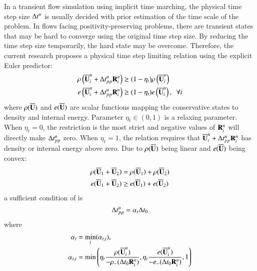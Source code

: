 \documentclass[preprint,12pt]{elsarticle}
\begin{document}
In a transient flow simulation using implicit
time marching, the
physical time step size $\mathrm\Delta t^n$
is usually decided with prior estimation
of the time scale of the problem.
In flows facing positivity-preserving problems,
there are transient states that may be hard
to converge using the original time step size.
By reducing the time step size temporarily,
the hard state may be overcome.
Therefore, the current research
proposes a physical time step limiting relation using
the explicit Euler predictor:
\begin{equation}
    \label{eq:ppLimitDt}
    \begin{aligned}
        \rho\left(\overline{\mathbf{U}}_i^n + \mathrm\Delta t^{n}_{pp}\mathbf{R}_i^n\right)
         & \geq
        (1- \eta_t)
        \rho\left(\overline{\mathbf{U}}_i^n\right) \\
        e\left(\overline{\mathbf{U}}_i^n + \mathrm\Delta t^{n}_{pp}\mathbf{R}_i^n\right)
         & \geq
        (1- \eta_t)
        e\left(\overline{\mathbf{U}}_i^n\right), \ \ \forall i
    \end{aligned}
\end{equation}
where $\rho(\overline{\mathbf{U}})$ and $e(\overline{\mathbf{U}})$ are scalar functions
mapping the conservative states to density and internal energy.
Parameter $\eta_t\in(0,1)$ is a relaxing parameter.
When $\eta_t=0$, the restriction is the most strict and
negative values of $\mathbf{R}_i^n$ will directly make $\mathrm\Delta t^n_{pp}$
zero.
When  $\eta_t=1$, the relation requires that $\overline{\mathbf{U}}_i^n + \mathrm\Delta t^{n}_{pp}\mathbf{R}_i^n$
has density or internal energy above zero.
Due to $\rho(\overline{\mathbf{U}})$ being linear and $e(\overline{\mathbf{U}})$ being convex:
\begin{equation}
    \begin{aligned}
        \rho(\overline{\mathbf{U}}_1 + \overline{\mathbf{U}}_2) & = \rho(\overline{\mathbf{U}}_1) + \rho(\overline{\mathbf{U}}_2) \\
        e(\overline{\mathbf{U}}_1 + \overline{\mathbf{U}}_2)    & \geq e(\overline{\mathbf{U}}_1) + e(\overline{\mathbf{U}}_2)    \\
    \end{aligned}
\end{equation}
a sufficient condition of  is
\begin{equation}
    \mathrm\Delta t^n_{pp} = \alpha_t \mathrm\Delta t_0 
\end{equation}
where
\begin{equation}
    \begin{aligned}
        \alpha_t     & = \min_i(\alpha_{t,i}), \\
        \alpha_{t,i} & = \min\left(
        \eta_t\frac{\rho(\overline{\mathbf{U}}_i^n)}{-\rho_-(\mathrm\Delta t_0 \mathbf{R}_i^n)},
        \eta_t\frac{e(\overline{\mathbf{U}}_i^n)}{-e_-(\mathrm\Delta t_0 \mathbf{R}_i^n)},
        1
        \right)
    \end{aligned}
\end{equation}
\end{document}
